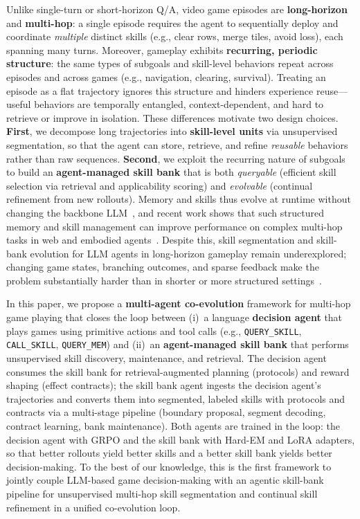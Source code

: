 Unlike single-turn or short-horizon Q/A, video game episodes are \textbf{long-horizon} and \textbf{multi-hop}: a single episode requires the agent to sequentially deploy and coordinate \emph{multiple} distinct skills (e.g., clear rows, merge tiles, avoid loss), each spanning many turns. Moreover, gameplay exhibits \textbf{recurring, periodic structure}: the same types of subgoals and skill-level behaviors repeat across episodes and across games (e.g., navigation, clearing, survival). Treating an episode as a flat trajectory ignores this structure and hinders experience reuse---useful behaviors are temporally entangled, context-dependent, and hard to retrieve or improve in isolation. These differences motivate two design choices. \textbf{First}, we decompose long trajectories into \textbf{skill-level units} via unsupervised segmentation, so that the agent can store, retrieve, and refine \emph{reusable} behaviors rather than raw sequences. \textbf{Second}, we exploit the recurring nature of subgoals to build an \textbf{agent-managed skill bank} that is both \emph{queryable} (efficient skill selection via retrieval and applicability scoring) and \emph{evolvable} (continual refinement from new rollouts). Memory and skills thus evolve at runtime without changing the backbone LLM~\cite{xu2025mem, sarch2024vlm}, and recent work shows that such structured memory and skill management can improve performance on complex multi-hop tasks in web and embodied agents~\cite{xia2026skillrl, zhang2026memrl, zhang2026memskill}. Despite this, skill segmentation and skill-bank evolution for LLM agents in long-horizon gameplay remain underexplored; changing game states, branching outcomes, and sparse feedback make the problem substantially harder than in shorter or more structured settings~\cite{berner2019dota, raad2024scaling}.

In this paper, we propose a \textbf{multi-agent co-evolution} framework for multi-hop game playing that closes the loop between (i)~a language \textbf{decision agent} that plays games using primitive actions and tool calls (e.g., \texttt{QUERY\_SKILL}, \texttt{CALL\_SKILL}, \texttt{QUERY\_MEM}) and (ii)~an \textbf{agent-managed skill bank} that performs unsupervised skill discovery, maintenance, and retrieval. The decision agent consumes the skill bank for retrieval-augmented planning (protocols) and reward shaping (effect contracts); the skill bank agent ingests the decision agent's trajectories and converts them into segmented, labeled skills with protocols and contracts via a multi-stage pipeline (boundary proposal, segment decoding, contract learning, bank maintenance). Both agents are trained in the loop: the decision agent with GRPO and the skill bank with Hard-EM and LoRA adapters, so that better rollouts yield better skills and a better skill bank yields better decision-making. To the best of our knowledge, this is the first framework to jointly couple LLM-based game decision-making with an agentic skill-bank pipeline for unsupervised multi-hop skill segmentation and continual skill refinement in a unified co-evolution loop.

